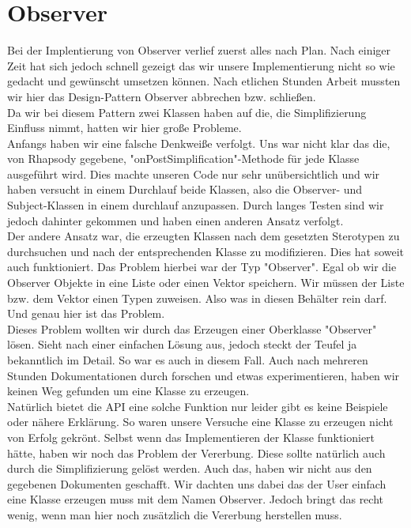 \section{Observer}
Bei der Implentierung von Observer verlief zuerst alles nach Plan. Nach einiger
Zeit hat sich jedoch schnell gezeigt das wir unsere Implementierung nicht so wie
gedacht und gewünscht umsetzen können. Nach etlichen Stunden Arbeit mussten wir
hier das Design-Pattern Observer abbrechen bzw. schließen.\\
Da wir bei diesem Pattern zwei Klassen haben auf die, die Simplifizierung
Einfluss nimmt, hatten wir hier große Probleme.\\
Anfangs haben wir eine falsche Denkweiße verfolgt. Uns war nicht klar das die,
von Rhapsody gegebene, "onPostSimplification"-Methode für jede Klasse ausgeführt
wird.
Dies machte unseren Code nur sehr unübersichtlich und wir haben versucht in einem Durchlauf
beide Klassen, also die Observer- und Subject-Klassen in einem durchlauf
anzupassen. Durch langes Testen sind wir jedoch dahinter gekommen und haben
einen anderen Ansatz verfolgt.\\
Der andere Ansatz war, die erzeugten Klassen nach dem
gesetzten Sterotypen zu durchsuchen und nach der entsprechenden Klasse zu modifizieren.
Dies hat soweit auch funktioniert. Das Problem hierbei war der Typ "Observer". Egal ob
wir die Observer Objekte in eine Liste oder einen Vektor speichern. Wir müssen der 
Liste bzw. dem Vektor einen Typen zuweisen. Also was in diesen Behälter rein darf. Und
genau hier ist das Problem.\\
Dieses Problem wollten wir durch das Erzeugen einer Oberklasse "Observer" lösen.
Sieht nach einer einfachen Lösung aus, jedoch steckt der Teufel ja bekanntlich
im Detail. So war es auch in diesem Fall. Auch nach mehreren Stunden
Dokumentationen durch forschen und etwas experimentieren, haben wir keinen Weg
gefunden um eine Klasse zu erzeugen.\\
Natürlich bietet die API eine solche Funktion nur leider gibt es keine Beispiele
oder nähere Erklärung. So waren unsere Versuche eine Klasse zu erzeugen nicht
von Erfolg gekrönt. Selbst wenn das Implementieren der Klasse funktioniert
hätte, haben wir noch das Problem der Vererbung. Diese sollte natürlich auch
durch die Simplifizierung gelöst werden. Auch das, haben wir nicht aus den
gegebenen Dokumenten geschafft. Wir dachten uns dabei das der User einfach eine
Klasse erzeugen muss mit dem Namen Observer. Jedoch bringt das recht wenig, wenn
man hier noch zusätzlich die Vererbung herstellen muss.\\
